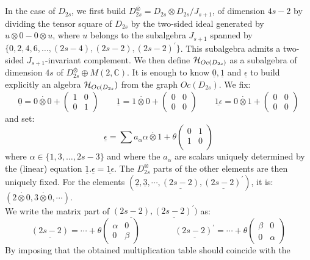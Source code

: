 \documentclass[a4paper,11pt]{article}
\def \otimesdot {\stackrel{\cdot}{\otimes}}
\newcommand{\CC}{\mathbb{C}}
\newcommand{\ud}[1]{\underline{#1}}
\begin{document}
In the case of $D_{2s}$, we first build $D_{2s}^{\otimesdot} =
D_{2s} \otimes D_{2s} / J_{s+1}$, of dimension $4s-2$
by dividing the tensor square of $D_{2s}$ by the two-sided ideal
generated by $u\otimes 0 - 0 \otimes u$, where $u$ belongs to the
subalgebra $J_{s+1}$ spanned by $\{0,2,4,6,\ldots, (2s-4), (2s-2),
(2s-2)^{'}\}$. This subalgebra admits a two-sided $J_{s+1}$-invariant
complement.
We then define ${\cal H}_{Oc(D_{2s})}$ as a subalgebra
of dimension $4s$ of  $D_{2s}^{\otimesdot} \oplus M(2,\CC)$. It is
enough to know $\ud{0}, \ud{1}$ and $\ud{\epsilon}$ to build explicitly
an algebra ${\cal H}_{Oc(D_{2s}})$ from the graph $Oc(D_{2s})$.
We fix:
$$\ud{0} = 0 \otimesdot 0 + \left(
\begin{array}{cc} 1 & 0 \\ 0 & 1 \end{array} \right)
\qquad
\ud{1} = 1 \otimesdot 0 + \left(
\begin{array}{cc} 0 & 0 \\ 0 & 0 \end{array} \right)
\qquad
\ud{1\epsilon} = 0 \otimesdot 1 + \left(
\begin{array}{cc} 0 & 0 \\ 0 & 0 \end{array} \right)
$$
and set:
$$\ud{\epsilon} = \sum a_{\alpha} \alpha \otimesdot 1 + \theta
\left( \begin{array}{cc} 0 & 1 \\ 1 & 0 \\ \end{array} \right)
$$
where $\alpha \in \{1,3,\ldots, 2s-3\}$ and where the $a_{\alpha}$ are
scalars uniquely determined by the (linear) equation $\ud1 .
\ud{\epsilon} = \ud{1\epsilon}$.
The $D_{2s}^{\otimesdot}$ parts of the other elements are then uniquely
fixed. For the elements $(\ud2, \ud3, \cdots, \ud{(2s-2)}, \ud{(2s-2)^{'}})$,
it is: $(2 \otimesdot 0, 3 \otimesdot 0, \cdots)$. \\
We write the matrix part of $\ud{(2s-2)}, \ud{(2s-2)^{'}})$ as:
$$
\ud{(2s-2)} = \cdots + \theta \left(
\begin{array}{cc} \alpha & 0 \\ 0 & \beta \end{array} \right)
\qquad \qquad
\ud{(2s-2)^{'}} = \cdots + \theta \left(
\begin{array}{cc} \beta & 0 \\ 0 & \alpha \end{array} \right)
$$
By imposing that the obtained multiplication table should coincide with the
\end{document}
